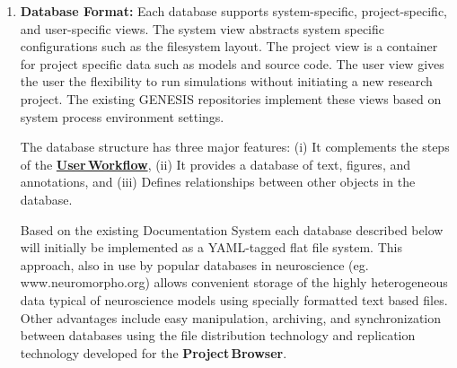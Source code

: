 \documentclass[12pt]{article}
\begin{document}
\begin{enumerate}
   \item {\bf Database Format:} Each database supports system-specific, project-specific, and user-specific views. The system view abstracts system specific configurations such as the filesystem layout. The project view is a container for project specific data such as models and source code. The user view gives the user the flexibility to run simulations without initiating a new research project. The existing GENESIS repositories implement these views based on system process environment settings.

The database structure has three major features: (i) It complements the steps of the \href{../workflow-user/workflow-user.tex}{\bf User\,Workflow}, (ii) It provides a database of text, figures, and annotations, and (iii) Defines relationships between other objects in the database. 

Based on the existing Documentation System each database described below will initially be implemented as a YAML-tagged flat file system. This approach, also in use by popular databases in neuroscience (eg. www.neuromorpho.org) allows convenient storage of the highly heterogeneous data typical of neuroscience models using specially formatted text based files. Other advantages include easy manipulation, archiving, and synchronization between databases using the file distribution technology and replication technology developed for the {\bf Project\,Browser}.


\end{enumerate}
\end{document}
